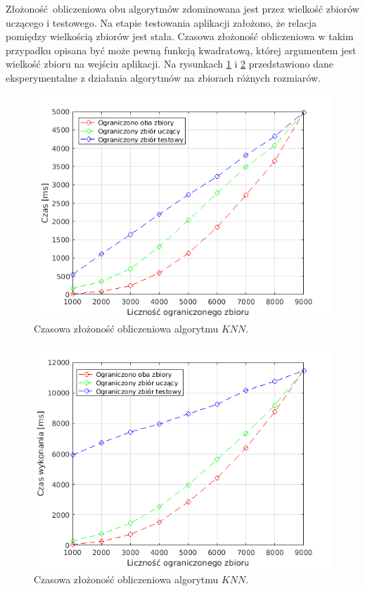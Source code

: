 Złożoność obliczeniowa obu algorytmów zdominowana jest przez wielkość zbiorów uczącego i testowego. Na etapie testowania aplikacji założono, że relacja pomiędzy wielkością zbiorów jest stała. Czasowa złożoność obliczeniowa w takim przypadku opisana być może pewną funkcją kwadratową, której argumentem jest wielkość zbioru na wejściu aplikacji.
Na rysunkach \ref{fig:knn_compexity} i \ref{fig:enn_complexity} przedstawiono dane eksperymentalne z działania algorytmów na zbiorach różnych rozmiarów.

\begin{figure}[H]
	\centering
	\includegraphics[width=11.5cm]{img/knn_compexity}
	\caption{Czasowa złożoność obliczeniowa algorytmu $KNN$.}
	\label{fig:knn_compexity}
\end{figure}
\begin{figure}[H]
	\centering
	\includegraphics[width=11.5cm]{img/enn_complexity}
	\caption{Czasowa złożoność obliczeniowa algorytmu $KNN$.}
	\label{fig:enn_complexity}
\end{figure}

